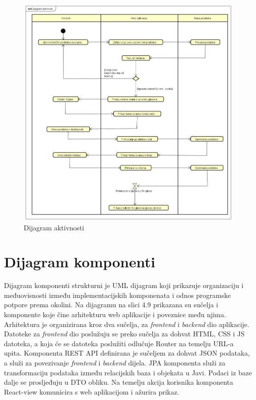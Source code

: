 		\begin{figure}[H]
			\includegraphics[scale=0.4]{dijagrami/dijagramAktivnosti} %
			\centering
			\caption{Dijagram aktivnosti}
			\label{fig:dijagramAktivnosti}
		\end{figure}
		
		\eject
		\section{Dijagram komponenti}
		
		Dijagram komponenti strukturni je UML dijagram koji prikazuje organizaciju i međuovisnosti između implementacijskih komponenata i odnos programske potpore prema okolini. Na dijagramu na slici 4.9 prikazana su sučelja i komponente koje čine arhitekturu web aplikacije i poveznice među njima. Arhitektura je organizirana kroz dva sučelja, za \textit{frontend} i \textit{backend} dio aplikacije. Datoteke za \textit{frontend} dio poslužuju se preko sučelja za dohvat HTML, CSS i JS datoteka, a koja će se datoteka poslužiti odlučuje Router na temelju URL-a upita. Komponenta REST API definirana je sučeljem za dohvat JSON podataka, a služi za povezivanje \textit{frontend} i \textit{backend} dijela. JPA komponenta služi za transformaciju podataka između relacijskih baza i objekata u Javi. Podaci iz baze dalje se prosljeđuju u DTO obliku. Na temelju akcija korisnika komponenta React-view komunicira s web aplikacijom i ažurira prikaz. 
		
